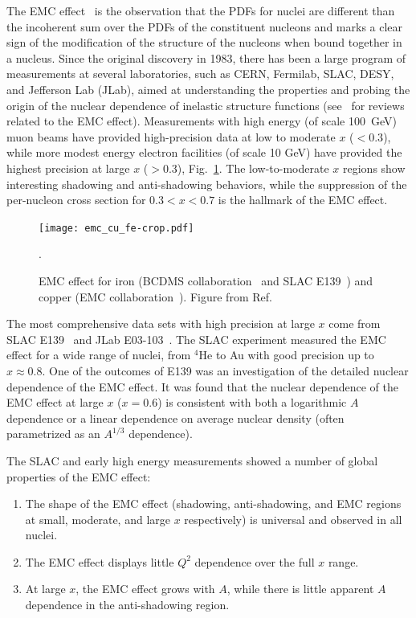The EMC effect~\cite{Aubert:1983xm} is the observation that the PDFs for nuclei are different than
the incoherent sum over the PDFs of the constituent nucleons and marks a clear sign of the modification
of the structure of the nucleons when bound together in a nucleus.
Since the original discovery in 1983, there has been a large
program of measurements at several laboratories, such as CERN, Fermilab, SLAC, DESY, and Jefferson Lab (JLab),
aimed at understanding the properties and probing the origin of the nuclear dependence of inelastic
structure functions (see~\cite{Geesaman:1995yd, Malace:2014uea, Hen:2016kwk} for reviews related to the EMC effect).
Measurements with high energy (of scale 100~GeV) muon beams have provided high-precision data at low to
moderate $x$ ($<0.3$), while more modest energy electron facilities (of scale 10 GeV) have provided
the highest precision at large $x$ ($>0.3$), Fig.~\ref{fig:emc_iron}.  The low-to-moderate $x$
regions show interesting shadowing and anti-shadowing behaviors, while the suppression of the
per-nucleon cross section for $0.3<x<0.7$ is the hallmark of the EMC effect.

\begin{figure}[tbp]
  \centering\texttt{[image: emc\_cu\_fe-crop.pdf]}
  \caption{EMC effect for iron (BCDMS collaboration~\cite{Benvenuti:1987az} and SLAC E139~\cite{Gomez:1993ri})
    and copper (EMC collaboration~\cite{Ashman:1992kv}).
    Figure from Ref.~\cite{Guzey:2012yk}}.
  \label{fig:emc_iron}
\end{figure}

The most comprehensive data sets with high precision at large $x$ come from SLAC E139~\cite{Gomez:1993ri} and JLab E03-103~\cite{Seely:2009gt}. The SLAC experiment
measured the EMC effect for a wide range of nuclei, from $^4$He to Au with good precision up to
$x\approx0.8$.  One of the outcomes of E139 was an investigation of the detailed nuclear dependence of the EMC
effect. It was found that the nuclear dependence of the EMC effect at large $x$ ($x=0.6$) is consistent
with both a logarithmic $A$ dependence or a linear dependence on average nuclear density (often parametrized as an $A^{1/3}$ dependence).

The SLAC and early high energy measurements showed a number of global properties of the EMC effect:
\begin{enumerate}
 \item{The shape of the EMC effect (shadowing, anti-shadowing, and EMC regions at small, moderate, and
  large $x$ respectively) is universal and observed in all nuclei.}
 \item{The EMC effect displays little $Q^2$ dependence over the full $x$ range.}
 \item{At large $x$, the EMC effect grows with $A$, while there is little apparent $A$ dependence in the
   anti-shadowing region.}
\end{enumerate}

